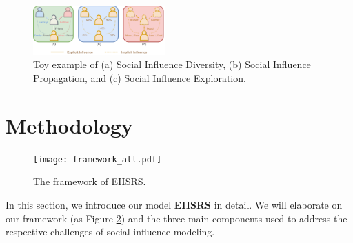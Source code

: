 \documentclass[letterpaper]{article} %
\begin{document}
\begin{figure}[ht!]
  \centering
  \includegraphics[width=0.451\textwidth]{motivation.pdf} %
  \caption{Toy example of (a) Social Influence Diversity, (b) Social Influence Propagation, and (c) Social Influence Exploration.}
  \label{fig_motivation}
\end{figure}

\section{Methodology}
\begin{figure}[ht]
  \centering
  \texttt{[image: framework\_all.pdf]}
  \caption{The framework of EIISRS.}
  \label{framework_all.pdf}
\end{figure}

In this section, we introduce our model \textbf{EIISRS} in detail. We will elaborate on our framework (as Figure \ref{framework_all.pdf}) and the three main components used to address the respective challenges of social influence modeling.
\end{document}
